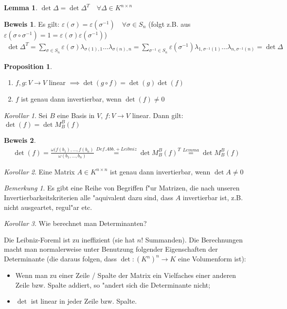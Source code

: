 \documentclass[11pt]{article}
\theoremstyle{remark}
\theoremstyle{definition}
\newtheorem{prof}{Beweis}
\newtheorem*{proposition}{Proposition}
\newtheorem*{lemma}{Lemma}
\theoremstyle{remark}
\newtheorem*{korollar}{Korollar}
\newtheorem*{bem}{Bemerkung}
\begin{document}
\begin{lemma}
	\(\det\Delta = \det\Delta^T\quad\forall \Delta\in K^{n\times n}\)
\end{lemma}
\begin{prof}
	Es gilt: \(\varepsilon(\sigma) = \varepsilon(\sigma^{-1})\quad\forall \sigma\in S_n \) (folgt z.B. aus \(\varepsilon(\sigma\circ\sigma^{-1})=1=\varepsilon(\sigma)\varepsilon(\sigma^{-1})\))
	\begin{align*}
	\det\Delta^T = \sum_{\sigma\in S_n}\varepsilon(\sigma)\lambda_{\sigma(1),1}\dots\lambda_{\sigma(n),n} = \sum_{\sigma^{-1}\in S_n}\varepsilon(\sigma^{-1})\lambda_{1,\sigma^{-1}(1)}\dots\lambda_{n,\sigma^{-1}(n)} = \det \Delta
	\end{align*}
\end{prof}
\begin{proposition}
	\begin{enumerate}
		\item \(f, g: V\to V \) linear \(\implies\det(g\circ f) = \det(g)\det(f) \)
		\item \(f\) ist genau dann invertierbar, wenn \(\det(f)\neq 0 \)
	\end{enumerate}
\end{proposition}
\begin{korollar}
	Sei \(B\) eine Basis in \(V\), \(f:V\to V \) linear. Dann gilt: \(\det(f) = \det M^B_B(f) \)
\end{korollar}
\begin{prof}
	\begin{align*}
	\det(f) = \frac{\omega(f(b_1),\dots,f(b_n)}{\omega(b_1,\dots,b_n)} \stackrel{Def. Abb. + Leibniz}{=} \det M^B_B(f)^T \stackrel{Lemma}{=} \det M_B^B(f)
	\end{align*}
\end{prof}
\begin{korollar}
	Eine Matrix \(A\in K^{n\times n} \) ist genau dann invertierbar, wenn \(\det A \neq 0 \)
\end{korollar}
\begin{bem}
	Es gibt eine Reihe von Begriffen f"ur Matrizen, die nach unseren Invertierbarkeitskriterien alle "aquivalent dazu sind, dass \(A \) invertierbar ist, z.B. nicht ausgeartet, regul"ar etc.
\end{bem}
\begin{korollar}
Wie berechnet man Determinanten?

Die Leibniz-Foreml ist zu ineffizient (sie hat \(n!\) Summanden). Die Berechnungen macht man normalerweise unter Benutzung folgender Eigenschaften der Determinante (die daraus folgen, dass \(\det : (K^n)^n \to K\) eine Volumenform ist):
\begin{itemize}
	\item Wenn man zu einer Zeile / Spalte der Matrix ein Vielfaches einer anderen Zeile bzw. Spalte addiert, so "andert sich die Determinante nicht;
	\item \(\det \) ist linear in jeder Zeile bzw. Spalte.
\end{itemize}
\end{korollar}
\end{document}
